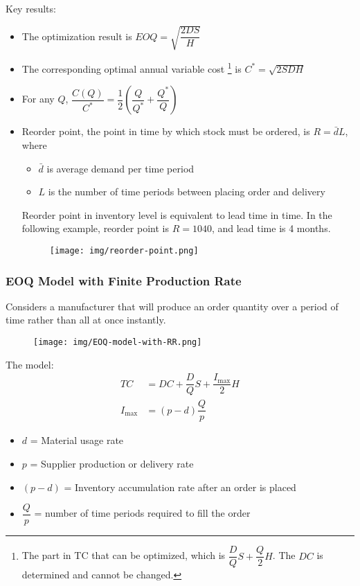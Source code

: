 \documentclass{article}
\begin{document}
Key results:
\begin{itemize}
	\item The optimization result is $EOQ = \sqrt{\dfrac{2DS}{H}}$
	\item The corresponding optimal annual variable cost
					\footnote{The part in TC that can be optimized, which is $\dfrac{D}{Q}S + \dfrac{Q}{2}H$. The $DC$ is determined and cannot be changed.} 
				is $C^* = \sqrt{2SDH}$
	\item For any $Q$, $\dfrac{C(Q)}{C^*} = \dfrac{1}{2} (\dfrac{Q}{Q^*} + \dfrac{Q^*}{Q})$
	\item Reorder point, the point in time by which stock must be ordered, is $R = \bar{d} L$,
	      where
	      \begin{itemize}
		      \item $\bar{d}$ is average demand per time period
		      \item $L$ is the number of time periods between placing order and delivery
	      \end{itemize}
	      Reorder point in inventory level is equivalent to lead time in time.
	      In the following example, reorder point is $R=1040$, and lead time is 4 months.
	      \begin{figure}[H]
		      \centering
		      \texttt{[image: img/reorder-point.png]}
	      \end{figure}
\end{itemize}

\subsubsection{EOQ Model with Finite Production Rate}

Considers a manufacturer that will produce an order quantity over a period of time
rather than all at once instantly.

\begin{figure}[H]
	\centering
	\texttt{[image: img/EOQ-model-with-RR.png]}
\end{figure}

The model:
\[
	\begin{aligned}
		TC & = DC + \dfrac{D}{Q} S + \dfrac{I_{\max}}{2}H \\
		I_{\max} &= (p-d) \dfrac{Q}{p}
	\end{aligned}
\]

\begin{itemize}
	\item $d$ = Material usage rate
	\item $p$ = Supplier production or delivery rate
	\item $(p-d)$ = Inventory accumulation rate after an order is placed
	\item $\dfrac{Q}{p}$ = number of time periods required to fill the order
\end{itemize}
\end{document}
